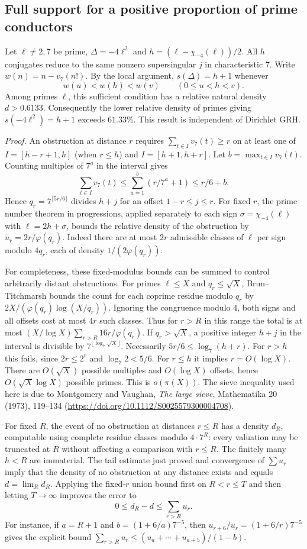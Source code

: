 \subsection*{Full support for a positive proportion of prime conductors}
Let $\ell\ne2,7$ be prime, $\Delta=-4\ell^2$ and
$h=(\ell-\chi_{-4}(\ell))/2$. All $h$ conjugates reduce to the same
nonzero supersingular $j$ in characteristic $7$. Write
$w(n)=n-v_7(n!)$. By the local argument, $s(\Delta)=h+1$ whenever
\[
 w(u)<w(h)<w(v)\qquad (0\le u<h<v).
\]
Among primes $\ell$, this sufficient condition has a relative natural
density $d>0.6133$. Consequently the lower relative density of primes
giving $s(-4\ell^2)=h+1$ exceeds $61.33\%$. This result is independent
of Dirichlet GRH.

\smallskip\noindent\emph{Proof.}
An obstruction at distance $r$ requires
$\sum_{t\in I}v_7(t)\ge r$ on at least one of
$I=[h-r+1,h]$ (when $r\le h$) and $I=[h+1,h+r]$.
Let $b=\max_{t\in I}v_7(t)$. Counting multiples of $7^a$ in the
interval gives
\[
 \sum_{t\in I}v_7(t)\le\sum_{a=1}^b(r/7^a+1)\le r/6+b.
\]
Hence $q_r=7^{\lceil5r/6\rceil}$ divides $h+j$ for an offset
$1-r\le j\le r$. For fixed $r$, the prime number theorem in
progressions, applied separately to each sign $\sigma=\chi_{-4}(\ell)$
with $\ell=2h+\sigma$, bounds the relative density of the obstruction by
$u_r=2r/\varphi(q_r)$. Indeed there are at most $2r$ admissible classes
of $\ell$ per sign modulo $4q_r$, each of density $1/(2\varphi(q_r))$.

For completeness, these fixed-modulus bounds can be summed to control
arbitrarily distant obstructions. For primes $\ell\le X$ and
$q_r\le\sqrt X$, Brun--Titchmarsh bounds the count for each coprime
residue modulo $q_r$ by $2X/(\varphi(q_r)\log(X/q_r))$.
Ignoring the congruence modulo $4$, both signs and all offsets cost at
most $4r$ such classes. Thus for $r>R$ in this range the total is at
most $(X/\log X)\sum_{r>R}16r/\varphi(q_r)$. If $q_r>\sqrt X$,
a positive integer $h+j$ in the interval is divisible by
$7^{\lfloor\log_7\sqrt X\rfloor}$. Necessarily
$5r/6\le\log_7(h+r)$. For $r>h$ this fails, since $2r\le2^r$ and
$\log_7 2<5/6$. For $r\le h$ it implies $r=O(\log X)$.
There are $O(\sqrt X)$ possible multiples and $O(\log X)$ offsets,
hence $O(\sqrt X\log X)$ possible primes. This is $o(\pi(X))$.
The sieve inequality used here is due to Montgomery and Vaughan,
\emph{The large sieve}, Mathematika 20 (1973), 119--134
(\url{https://doi.org/10.1112/S0025579300004708}).

For fixed $R$, the event of no obstruction at distances $r\le R$ has
a density $d_R$, computable using complete residue classes modulo
$4\cdot7^R$: every valuation may be truncated at $R$ without affecting
a comparison with $r\le R$. The finitely many $h<R$ are immaterial.
The tail estimate just proved and convergence of $\sum u_r$ imply that
the density of no obstruction at any distance exists and equals
$d=\lim_Rd_R$. Applying the fixed-$r$ union bound first on
$R<r\le T$ and then letting $T\to\infty$ improves the error to
\[
                  0\le d_R-d\le\sum_{r>R}u_r.
\]
For instance, if $a=R+1$ and $b=(1+6/a)7^{-5}$, then
$u_{r+6}/u_r=(1+6/r)7^{-5}$ gives the explicit bound
$\sum_{r>R}u_r\le (u_a+\cdots+u_{a+5})/(1-b)$.

